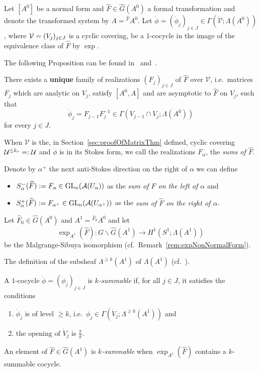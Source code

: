 Let $[A^0]$ be a normal form and $\hat F\in\hat G(A^0)$ a formal
transformation and denote the transformed system by $A={}^{\hat F}\!A^0$.
Let $\dot\phi=(\dot\phi_j)_{j\in J}\in\Gamma(\dot{\mathcal{V}};\Lambda(A^0))$,
where $\mathcal{V}=(V_j)_{j\in J}$ is a cyclic covering, be a $1$-cocycle in the image
of the equivalence class of $\hat F$ by $\exp$.

The following Proposition can be found in~\cite[Prop.III.2.1]{Loday1994}
and~\cite[Thm.4.3.13]{Loday2014}.
\begin{prop}\label{prop:multisummability}
  There exists a \textbf{unique} family of realizations $(F_j)_{j\in J}$ of
  $\hat F$ over $\mathcal{V}$, i.e.\ matrices $F_j$ which are analytic on
  $V_j$, satisfy $[A^0,A]$ and are asymptotic to $\hat F$ on $V_j$, such that
  \[
    \dot\phi_j=F_{j-1}F_j^{-1} \in\Gamma(V_{j-1}\cap V_j;\Lambda(A^0))
  \]
  for every $j\in J$.
\end{prop}
When $\mathcal{V}$ is the, in Section~\ref{sec:proofOfMatrixThm} defined,
cyclic covering $\mathcal{U}^{\leq k_r}=:\mathcal{U}$ and $\dot\phi$ is in its Stokes
form\TODO[~(cf.~??)], we call the realizations $F_{\alpha}$, the
\emph{sums of $\hat F$}.
\begin{defn}\label{defn:sumsLeftRight}
  Denote by $\alpha^+$ the next anti-Stokes direction on the right of $\alpha$
  we can define
  \begin{itemize}
  \item $S_\alpha^-(\widehat F):=F_\alpha\in\operatorname{GL}_n(\mathcal{A}(U_\alpha))$ as the \emph{sum
      of $\hat F$ on the left of $\alpha$} and
  \item $S_\alpha^+(\widehat F):=F_{\alpha^+}\in\operatorname{GL}_n(\mathcal{A}(U_{\alpha^+}))$ as the
    \emph{sum of $\hat F$ on the right of $\alpha$}.
  \end{itemize}
\end{defn}

Let $\hat F_0\in\hat G(A^0)$ and $A^1={}^{\hat F_0}\!A^0$ and let
\[
  \exp_{A^1}(\hat F):G\backslash\hat G(A^1) \to H^1(S^1;\Lambda(A^1))
\]
be the Malgrange-Sibuya isomorphism (cf.\ Remark~\ref{rem:expNonNormalForm}).

The definition of the subsheaf $\Lambda^{\geq k}(A^1)$ of $\Lambda(A^1)$
 (cf.\ \cite[883]{Loday1994}).
\begin{defn}
  A $1$-cocycle $\dot\phi=(\dot\phi_j)_{j\in J}$ is \emph{$k$-summable} if, for
  all $j\in J$, it satisfies the conditions
  \begin{enumerate}
    \item $\dot\phi_j$ is of level $\geq k$,
      i.e.\ $\phi_j\in\Gamma(\dot V_j;\Lambda^{\geq k}(A^1))$ and
    \item the opening of $\dot V_j$ is $\frac{\pi}{k}$.
  \end{enumerate}
  An element of $\hat F\in\hat G(A^1)$ is \emph{$k$-summable} when
  $\exp_{A^1}(\hat F)$ contains a $k$-summable cocycle.
\end{defn}

